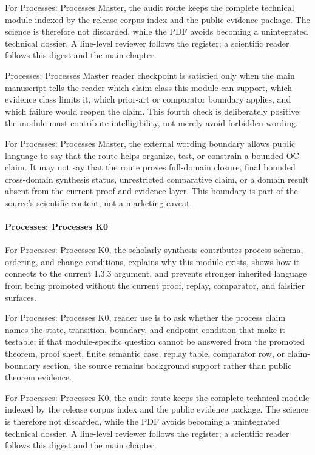 For Processes: Processes Master, the audit route keeps the complete technical module indexed by the release corpus index and the public evidence package. The science is therefore not discarded, while the PDF avoids becoming a unintegrated technical dossier. A line-level reviewer follows the register; a scientific reader follows this digest and the main chapter.


Processes: Processes Master reader checkpoint is satisfied only when the main manuscript tells the reader which claim class this module can support, which evidence class limits it, which prior-art or comparator boundary applies, and which failure would reopen the claim. This fourth check is deliberately positive: the module must contribute intelligibility, not merely avoid forbidden wording.


For Processes: Processes Master, the external wording boundary allows public language to say that the route helps organize, test, or constrain a bounded OC claim. It may not say that the route proves full-domain closure, final bounded cross-domain synthesis status, unrestricted comparative claim, or a domain result absent from the current proof and evidence layer. This boundary is part of the source's scientific content, not a marketing caveat.


\paragraph{Processes: Processes K0}

For Processes: Processes K0, the scholarly synthesis contributes process schema, ordering, and change conditions, explains why this module exists, shows how it connects to the current 1.3.3 argument, and prevents stronger inherited language from being promoted without the current proof, replay, comparator, and falsifier surfaces.


For Processes: Processes K0, reader use is to ask whether the process claim names the state, transition, boundary, and endpoint condition that make it testable; if that module-specific question cannot be answered from the promoted theorem, proof sheet, finite semantic case, replay table, comparator row, or claim-boundary section, the source remains background support rather than public theorem evidence.


For Processes: Processes K0, the audit route keeps the complete technical module indexed by the release corpus index and the public evidence package. The science is therefore not discarded, while the PDF avoids becoming a unintegrated technical dossier. A line-level reviewer follows the register; a scientific reader follows this digest and the main chapter.


